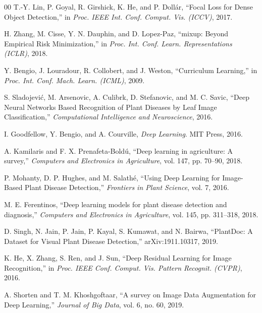 \documentclass[conference]{IEEEtran}
\begin{document}
\begin{thebibliography}{00}
T.-Y. Lin, P. Goyal, R. Girshick, K. He, and P. Doll\'ar,
``Focal Loss for Dense Object Detection,''
in \textit{Proc. IEEE Int. Conf. Comput. Vis. (ICCV)}, 2017.

H. Zhang, M. Cisse, Y. N. Dauphin, and D. Lopez-Paz,
``mixup: Beyond Empirical Risk Minimization,''
in \textit{Proc. Int. Conf. Learn. Representations (ICLR)}, 2018.

Y. Bengio, J. Louradour, R. Collobert, and J. Weston,
``Curriculum Learning,''
in \textit{Proc. Int. Conf. Mach. Learn. (ICML)}, 2009.

S. Sladojevi\'c, M. Arsenovic, A. Culibrk, D. Stefanovic, and M. C. Savic,
``Deep Neural Networks Based Recognition of Plant Diseases by Leaf Image Classification,''
\textit{Computational Intelligence and Neuroscience}, 2016.

I. Goodfellow, Y. Bengio, and A. Courville, \textit{Deep Learning}. MIT Press, 2016.

A. Kamilaris and F. X. Prenafeta-Bold\'u,
``Deep learning in agriculture: A survey,''
\textit{Computers and Electronics in Agriculture}, vol. 147, pp. 70--90, 2018.

P. Mohanty, D. P. Hughes, and M. Salath\'e,
``Using Deep Learning for Image-Based Plant Disease Detection,''
\textit{Frontiers in Plant Science}, vol. 7, 2016.

M. E. Ferentinos,
``Deep learning models for plant disease detection and diagnosis,''
\textit{Computers and Electronics in Agriculture}, vol. 145, pp. 311--318, 2018.

D. Singh, N. Jain, P. Jain, P. Kayal, S. Kumawat, and N. Bairwa,
``PlantDoc: A Dataset for Visual Plant Disease Detection,''
arXiv:1911.10317, 2019.

K. He, X. Zhang, S. Ren, and J. Sun,
``Deep Residual Learning for Image Recognition,''
in \textit{Proc. IEEE Conf. Comput. Vis. Pattern Recognit. (CVPR)}, 2016.

A. Shorten and T. M. Khoshgoftaar,
``A survey on Image Data Augmentation for Deep Learning,''
\textit{Journal of Big Data}, vol. 6, no. 60, 2019.

\end{thebibliography}
\end{document}
